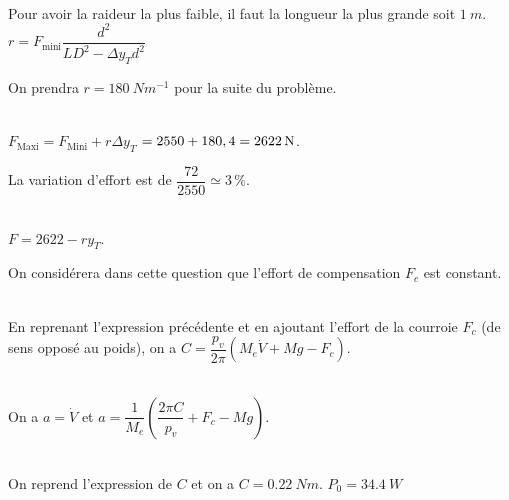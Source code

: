 \begin{multicols}{2}
\ifprof
\begin{corrige}~\\
Pour avoir la raideur la plus faible, il faut la longueur la plus grande soit $\SI{1}{m}$.
$r =F_{\text{mini}}\dfrac{ d^2}{ L D^2-\Delta y_T d^2}$ 
\end{corrige}
\else
\fi

On prendra $r=\SI{180}{Nm^{-1}}$ pour la suite du problème.

\ifprof
\begin{corrige}~\\
$F_{\text{Maxi}}  =F_{\text{Mini}}+r\Delta y_T$ $=2550+180\time 0,4 = \SI{2622}{N}$.

La variation d'effort est de $\dfrac{72}{2550}\simeq 3\,\%$. 
\end{corrige}
\else
\fi

\ifprof
\begin{corrige}~\\
$F=2622-r y_T$.
\end{corrige}
\else
\fi

On considérera dans cette question que l’effort de compensation $F_c$ est constant.

\ifprof
\begin{corrige}~\\
En reprenant l'expression précédente et en ajoutant l'effort de la courroie $F_c$ (de sens opposé au poids), on a 
$C = \dfrac{p_v}{2\pi}\left(M_e \dot{V} +Mg-F_c\right) $.
\end{corrige}
\else
\fi

\ifprof
\begin{corrige}~\\
On a $a=\dot{V}$ et $a=\dfrac{1}{M_e}\left( \dfrac{2\pi C}{p_v}+F_c-Mg \right)$.
\end{corrige}
\else
\fi

\ifprof
\begin{corrige}~\\
On reprend l'expression de $C$ et on a $C=\SI{0,22}{Nm}$.
$P_0=\SI{34,4}{W}$
\end{corrige}
\else
\fi


\end{multicols}
